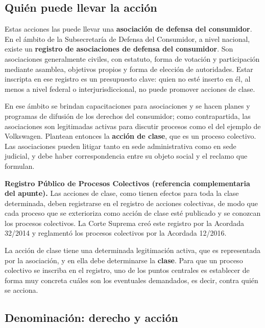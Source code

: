 \documentclass[12pt,oneside]{book}
\begin{document}
\subsection{Quién puede llevar la acción}

Estas acciones las puede llevar una \textbf{asociación de defensa del consumidor}. En el ámbito de la Subsecretaría de Defensa del Consumidor, a nivel nacional, existe un \textbf{registro de asociaciones de defensa del consumidor}. Son asociaciones generalmente civiles, con estatuto, forma de votación y participación mediante asamblea, objetivos propios y forma de elección de autoridades. Estar inscripta en ese registro es un presupuesto clave: quien no esté inserto en él, al menos a nivel federal o interjurisdiccional, no puede promover acciones de clase.

En ese ámbito se brindan capacitaciones para asociaciones y se hacen planes y programas de difusión de los derechos del consumidor; como contrapartida, las asociaciones son legitimadas activas para discutir procesos como el del ejemplo de Volkswagen. Plantean entonces la \textbf{acción de clase}, que es un proceso colectivo. Las asociaciones pueden litigar tanto en sede administrativa como en sede judicial, y debe haber correspondencia entre su objeto social y el reclamo que formulan.

\begin{note}
\textbf{Registro Público de Procesos Colectivos (referencia complementaria del apunte).} Las acciones de clase, como tienen efectos para toda la clase determinada, deben registrarse en el registro de acciones colectivas, de modo que cada proceso que se exterioriza como acción de clase esté publicado y se conozcan los procesos colectivos. La Corte Suprema creó este registro por la Acordada 32/2014 y reglamentó los procesos colectivos por la Acordada 12/2016.
\end{note}

La acción de clase tiene una determinada legitimación activa, que es representada por la asociación, y en ella debe determinarse la \textbf{clase}. Para que un proceso colectivo se inscriba en el registro, uno de los puntos centrales es establecer de forma muy concreta cuáles son los eventuales demandados, es decir, contra quién se acciona.

\subsection{Denominación: derecho y acción}
\end{document}
